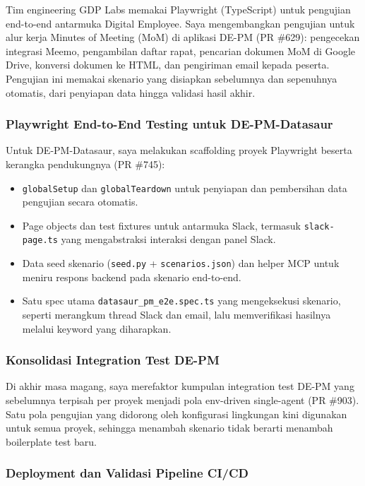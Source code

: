 Tim engineering GDP Labs memakai Playwright (TypeScript) untuk pengujian end-to-end antarmuka Digital Employee. Saya mengembangkan pengujian untuk alur kerja Minutes of Meeting (MoM) di aplikasi DE-PM (PR \#629): pengecekan integrasi Meemo, pengambilan daftar rapat, pencarian dokumen MoM di Google Drive, konversi dokumen ke HTML, dan pengiriman email kepada peserta. Pengujian ini memakai skenario yang disiapkan sebelumnya dan sepenuhnya otomatis, dari penyiapan data hingga validasi hasil akhir.

\subsubsection{Playwright End-to-End Testing untuk DE-PM-Datasaur}

Untuk DE-PM-Datasaur, saya melakukan scaffolding proyek Playwright beserta kerangka pendukungnya (PR \#745):

\begin{itemize}
    \item \texttt{globalSetup} dan \texttt{globalTeardown} untuk penyiapan dan pembersihan data pengujian secara otomatis.
    \item Page objects dan test fixtures untuk antarmuka Slack, termasuk \texttt{slack-page.ts} yang mengabstraksi interaksi dengan panel Slack.
    \item Data seed skenario (\texttt{seed.py} + \texttt{scenarios.json}) dan helper MCP untuk meniru respons backend pada skenario end-to-end.
    \item Satu spec utama \texttt{datasaur\_pm\_e2e.spec.ts} yang mengeksekusi skenario, seperti merangkum thread Slack dan email, lalu memverifikasi hasilnya melalui keyword yang diharapkan.
\end{itemize}

\subsubsection{Konsolidasi Integration Test DE-PM}

Di akhir masa magang, saya merefaktor kumpulan integration test DE-PM yang sebelumnya terpisah per proyek menjadi pola env-driven single-agent (PR \#903). Satu pola pengujian yang didorong oleh konfigurasi lingkungan kini digunakan untuk semua proyek, sehingga menambah skenario tidak berarti menambah boilerplate test baru.

\subsubsection{Deployment dan Validasi Pipeline CI/CD}

